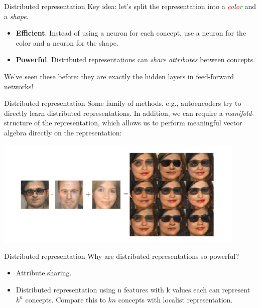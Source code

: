 \begin{frame}{Distributed representation}
Key idea: let's split the representation into a \textit{\textcolor{red}{c}\textcolor{green}{o}\textcolor{blue}{l}\textcolor{red}{o}\textcolor{green}{r}} and a \textit{shape}. \newline

\begin{itemize}
	\item \textbf{Efficient}. Instead of using a neuron for each concept, use a neuron for the color and a neuron for the shape. 
	\item \textbf{Powerful}. Distributed representations can \textit{share attributes} between concepts. 
\end{itemize} \newlinew

We've seen these before: they are exactly the hidden layers in feed-forward networks! 
\end{frame}

\begin{frame}{Distributed representation}
Some family of methods, e.g., autoencoders try to directly learn distributed representations. In addition, we can require a \textit{manifold}-structure of the representation, which allows us to perform meaningful vector algebra directly on the representation:

\centering
\includegraphics[width=0.9\textwidth]{figures/manifold_algebra.png}
\label{Radford et al. 2015}
\end{frame}

\begin{frame}{Distributed representation}
Why are distributed representations so powerful? \linebreak

\begin{itemize}
	\item Attribute sharing. 
	\item Distributed representation using n features with k values each can represent $k^n$ concepts. Compare this to $kn$ concepts with localist representation. 
\end{itemize}
\end{frame}

